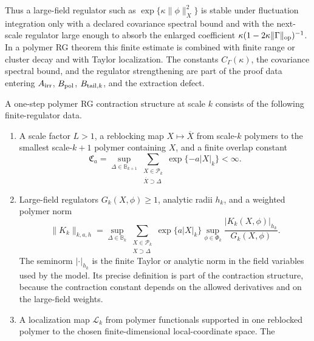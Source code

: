 Thus a large-field regulator such as
\(\exp\{\kappa\|\phi\|^2_X\}\) is stable under fluctuation integration only
with a declared covariance spectral bound and with the next-scale regulator
large enough to absorb the enlarged coefficient
\(\kappa(1-2\kappa\|\Gamma\|_{\rm op})^{-1}\).  In a polymer RG theorem this
finite estimate is combined with finite range or cluster decay and with
Taylor localization.  The constants \(C_\Gamma(\kappa)\), the covariance
spectral bound, and the regulator strengthening are part of the proof data
entering \(A_{\rm irr}\), \(B_{\rm pol}\), \(B_{{\rm tail},k}\), and the
extraction defect.

\begin{definition}
\label{def:one-step-polymer-rg-contraction-datum}
A one-step polymer RG contraction structure at scale \(k\) consists of the
following finite-regulator data.
\begin{enumerate}
  \item A scale factor \(L>1\), a reblocking map
  \(X\mapsto \overline X\) from scale-\(k\) polymers to the smallest
  scale-\(k+1\) polymer containing \(X\), and a finite overlap constant
  \begin{equation}
    \mathfrak C_a
    =
    \sup_{\Delta\in\mathbb B_{k+1}}
    \sum_{\substack{X\in\mathcal P_k\\ \overline X\supset\Delta}}
    \exp\{-a|X|_k\}
    <\infty .
    \label{eq:polymer-overlap-constant}
  \end{equation}
  \item Large-field regulators \(G_k(X,\phi)\geq1\), analytic radii \(h_k\),
  and a weighted polymer norm
  \begin{equation}
    \|K_k\|_{k,a,h}
    =
    \sup_{\Delta\in\mathbb B_k}
    \sum_{\substack{X\in\mathcal P_k\\ X\supset\Delta}}
    \exp\{a|X|_k\}
    \sup_{\phi\in\Phi_k}
    \frac{|K_k(X,\phi)|_{h_k}}{G_k(X,\phi)} .
    \label{eq:rg-polymer-norm}
  \end{equation}
  The seminorm \(|\cdot|_{h_k}\) is the finite Taylor or analytic norm in the
  field variables used by the model.  Its precise definition is part of the
  contraction structure, because the contraction constant depends on the allowed derivatives
  and on the large-field weights.
  \item A localization map
  \(\mathcal L_k\) from polymer functionals supported in one reblocked
  polymer to the chosen finite-dimensional local-coordinate space.  The

\end{enumerate}
\end{definition}
